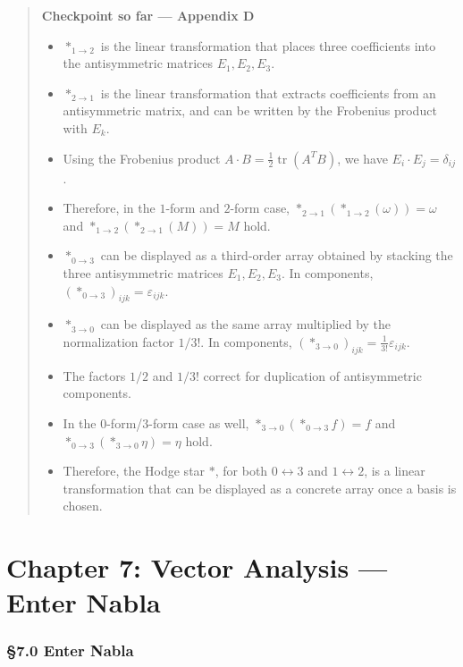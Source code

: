 \begin{quote}
\textbf{Checkpoint so far — Appendix D}

\begin{itemize}
\item
  \(\ast_{1\to2}\) is the linear transformation that places three
  coefficients into the antisymmetric matrices \(E_1,E_2,E_3\).
\item
  \(\ast_{2\to1}\) is the linear transformation that extracts
  coefficients from an antisymmetric matrix, and can be written by the
  Frobenius product with \(E_k\).
\item
  Using the Frobenius product
  \(A\cdot B=\frac{1}{2}\operatorname{tr}(A^TB)\), we have
  \(E_i\cdot E_j=\delta_{ij}\).
\item
  Therefore, in the \(1\)-form and \(2\)-form case,
  \(\ast_{2\to1}(\ast_{1\to2}(\omega))=\omega\) and
  \(\ast_{1\to2}(\ast_{2\to1}(M))=M\) hold.
\item
  \(\ast_{0\to3}\) can be displayed as a third-order array obtained by
  stacking the three antisymmetric matrices \(E_1,E_2,E_3\). In
  components, \((\ast_{0\to3})_{ijk}=\varepsilon_{ijk}\).
\item
  \(\ast_{3\to0}\) can be displayed as the same array multiplied by the
  normalization factor \(1/3!\). In components,
  \((\ast_{3\to0})_{ijk}=\frac{1}{3!}\varepsilon_{ijk}\).
\item
  The factors \(1/2\) and \(1/3!\) correct for duplication of
  antisymmetric components.
\item
  In the \(0\)-form/\(3\)-form case as well,
  \(\ast_{3\to0}(\ast_{0\to3}f)=f\) and
  \(\ast_{0\to3}(\ast_{3\to0}\eta)=\eta\) hold.
\item
  Therefore, the Hodge star \(\ast\), for both \(0\leftrightarrow3\) and
  \(1\leftrightarrow2\), is a linear transformation that can be
  displayed as a concrete array once a basis is chosen.
\end{itemize}
\end{quote}

\newpage

\hypertarget{chapter-7-vector-analysis-enter-nabla}{%
\chapter{Chapter 7: Vector Analysis --- Enter
Nabla}\label{chapter-7-vector-analysis-enter-nabla}}

\hypertarget{enter-nabla}{%
\subsection{§7.0 Enter Nabla}\label{enter-nabla}}

